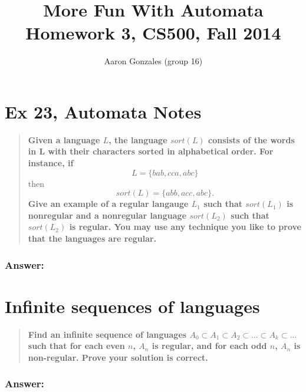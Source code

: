 \documentclass[titlepage]{article}\usepackage[]{graphicx}\usepackage[]{color}
\begin{document}
\title{More Fun With Automata \\ Homework 3, CS500, Fall 2014}
\author{Aaron Gonzales (group 16)}
\maketitle


\section{Ex 23, Automata Notes}
\begin{quote}
  \textbf{Given a language \(L\), the language \(sort(L)\) consists of the words
  in L with their characters sorted in alphabetical order. For instance, if }
  \[ L = \{ bab, cca, abc\} \]
  then
  \[ sort(L) = \{ abb, acc, abc\}. \]
  \textbf{ Give an example of a regular langauge \(L_1\) such that
  \(sort(L_1)\)  is nonregular and a nonregular language \(sort(L_2)\) such
  that \(sort(L_2)\) is regular. You may use any technique you like to prove that
  the languages are regular.}
\end{quote}
\subsubsection*{Answer:}
\vspace{5cm}


\section{Infinite sequences of languages}
\begin{quote}
  \textbf{Find an infinite sequence of languages \( A_0 \subset A_1 \subset A_2
    \subset \dots \subset A_k \subset \dots \)
    such that for each even \( n \), \( A_n\) is regular, and for each odd
    \(n\), \(A_n \) is non-regular. Prove your solution is correct.}
\end{quote}
\subsubsection*{Answer:}
\vspace{5cm}


\end{document}
